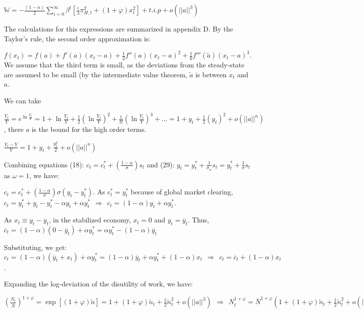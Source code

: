 \documentclass[
]{article}
\begin{document}
\(\displaystyle \mathbb{W}= -\frac{(1-\alpha)}{2}\sum_{i=0}^{\infty} \beta^t \left[ \frac{\varepsilon}{\lambda}\pi_{H,t}^2+ (1+\varphi)x_t^2 \right] + t.i.p+ o(||a||^3)\)

\vspace{8pt}

The calculations for this expressions are summarized in appendix D. By
the Taylor's rule, the second order approximation is:

\(\displaystyle f(x_t) = f(a) + f'(a)(x_t-a) + \frac{1}{2}f''(a)(x_t-a)^2 + \frac{1}{6}f'''(\widetilde{a})(x_t-a)^3\).
We assume that the third term is small, as the deviations from the
steady-state are assumed to be small (by the intermediate value theorem,
\(\widetilde{a}\) is between \(x_t\) and \(a\).

We can take

\(\displaystyle \frac{Y_t}{Y}=e^{\ln \frac{Y_t}{Y}}=1+\ln \frac{Y_t}{Y}+\frac{1}{2} \left( \ln \frac{Y_t}{Y} \right)^2 + \frac{1}{3!}\left( \ln \frac{Y_t}{Y} \right)^3 + ... = 1+y_t+\frac{1}{2} \left( y_t \right)^2+o(||a||^n)\),
there \(a\) is the bound for the high order terms.

\(\displaystyle \frac{Y_t-Y}{Y}= 1+y_t+\frac{y_t^2}{2} +o(||a||^n)\)

Combining equations (18):
\(\displaystyle c_t=c_t^*+ \left(\frac{1-\alpha}{\sigma} \right) s_t\)
and (29):
\(\displaystyle y_t = y_t^*+\frac{1}{\sigma_\alpha}s_t = y_t^*+\frac{1}{\sigma}s_t\)
as \(\omega=1\), we have:

\(\displaystyle c_t=c_t^*+\left( \frac{1-\alpha}{\sigma} \right)\sigma(y_t-y_t^*)\).
As \(c_t^*=y_t^*\) because of global market clearing,
\(c_t=y_t^* + y_t -y_t^* -\alpha y_t + \alpha y_t^* \ \ \Rightarrow \ \ c_t = (1-\alpha)y_t+\alpha y_t^*\).

As \(x_t \equiv y_t-\overline{y}_t\), in the stabilized economy,
\(x_t=0\) and \(y_t=\overline{y}_t\). Thus,
\(\overline{c}_t = (1-\alpha)(0-\overline{y}_t)+\alpha y_t^*=\alpha y_t^*-(1-\alpha)\overline {y}_t\)

Substituting, we get:
\(c_t = (1-\alpha)(\overline{y}_t+x_t)+\alpha y_t^*=(1-\alpha)\overline{y}_t+\alpha y_t^* +(1-\alpha)x_t \ \ \Rightarrow \ \ c_t=\overline{c}_t+(1-\alpha)x_t\).

Expanding the log-deviation of the disutility of work, we have:

\(\displaystyle \left( \frac{N_t}{\overline{N} } \right)^{1+\varphi}=\exp[(1+\varphi)\widetilde{n}]=1+(1+\varphi)\widetilde{n}_t + \frac{1}{2}\widetilde{n}_t^2 + o(||a||^3) \ \ \Rightarrow \ \ N_t^{1+\varphi} = \overline{N}^{1+\varphi} \left( 1+(1+\varphi)\widetilde{n}_t + \frac{1}{2}\widetilde{n}_t^2 + o(||b||^3) \right)\)
\end{document}
